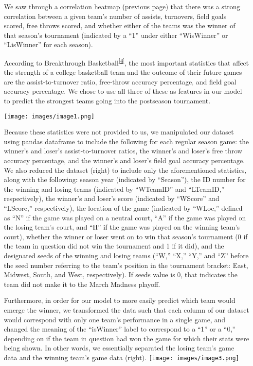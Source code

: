 \documentclass[
]{article}
\begin{document}
{}

{We saw through a correlation heatmap (previous page) that there was a
strong correlation between a given team's number of assists, turnovers,
field goals scored, free throws scored, and whether either of the teams
was the winner of that season's tournament (indicated by a ``1'' under
either ``WisWinner'' or ``LisWinner'' for each season). }

{}

{According to Breakthrough
Basketball}\textsuperscript{\protect\hyperlink{ftnt4}{{[}4{]}}}{, the
most important statistics that affect the strength of a college
basketball team and the outcome of their future games are the
assist-to-turnover ratio, free-throw accuracy percentage, and field goal
accuracy percentage. We chose to use all three of these as features in
our model to predict the strongest teams going into the postseason
tournament. }

{\texttt{[image: images/image1.png]}}

{Because these statistics were not provided to us, we manipulated our
dataset using pandas dataframe to include the following for each regular
season game: the winner's and loser's assist-to-turnover ratios, the
winner's and loser's free throw accuracy percentage, and the winner's
and loser's field goal accuracy percentage. We also reduced the dataset
(right) to include only the aforementioned statistics, along with the
following: season year (indicated by ``Season''), the ID number for the
winning and losing teams (indicated by ``WTeamID'' and ``LTeamID,''
respectively), the winner's and loser's score (indicated by ``WScore''
and ``LScore,'' respectively), the location of the game (indicated by
``WLoc,'' defined as ``N'' if the game was played on a neutral court,
``A'' if the game was played on the losing team's court, and ``H'' if
the game was played on the winning team's court), whether the winner or
loser went on to win that season's tournament (0 if the team in question
did not win the tournament and 1 if it did), and the designated seeds of
the winning and losing teams (``W,'' ``X,'' ``Y,'' and ``Z'' before the
seed number referring to the team's position in the tournament bracket:
East, Midwest, South, and West, respectively). If seeds value is 0, that
indicates the team did not make it to the March Madness playoff. }

{}

{Furthermore, in order for our model to more easily predict which team
would emerge the winner, we transformed the data such that each column
of our dataset would correspond with only one team's performance in a
single game, and changed the meaning of the ``isWinner'' label to
correspond to a ``1'' or a ``0,'' depending on if the team in question
had won the game for which their stats were being shown. In other words,
we essentially separated the losing team's game data and the winning
team's game data (right). }{\texttt{[image: images/image3.png]}}
\end{document}
